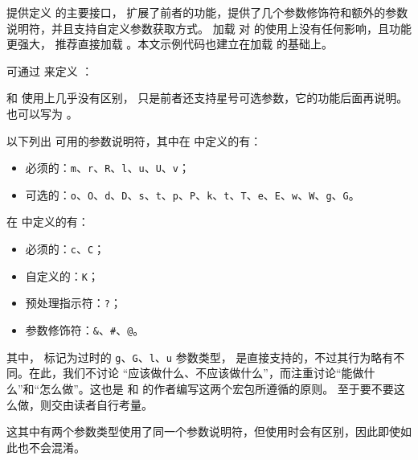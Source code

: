 \documentclass[openany]{book}
\begin{document}
 提供定义  的主要接口，
扩展了前者的功能，提供了几个参数修饰符和额外的参数说明符，并且支持自定义参数获取方式。
加载  对  的使用上没有任何影响，且功能更强大，
推荐直接加载 。本文示例代码也建立在加载  的基础上。

可通过  来定义 ：
\begin{syntax}
  \V\DeclareEKeysCommand   {}  
  \V\DeclareEKeysCommand *   
\end{syntax}
 和  使用上几乎没有区别，
只是前者还支持星号可选参数，它的功能后面再说明。
 也可以写为 。

以下列出  可用的参数说明符，其中在  中定义的有：
\begin{itemize}
  \item 必须的：\texttt m、\texttt r、\texttt R、\texttt l、\texttt u、\texttt U、\texttt v；
  \item 可选的：\texttt o、\texttt O、\texttt d、\texttt D、\texttt s、\texttt t、\texttt p、\texttt P、\texttt k、\texttt t、\texttt T、\texttt e、\texttt E、\texttt w、\texttt W、\texttt g、\texttt G。
\end{itemize}
在  中定义的有：
\begin{itemize}
  \item 必须的：\texttt c、\texttt C；
  \item 自定义的：\texttt K；
  \item 预处理指示符：\texttt ?；
  \item 参数修饰符：\texttt\&、\texttt\#、\texttt @。
\end{itemize}

其中， 标记为过时的 \texttt g、\texttt G、\texttt l、\texttt u 
参数类型， 是直接支持的，不过其行为略有不同。在此，我们不讨论
“应该做什么、不应该做什么”，而注重讨论“能做什么”和“怎么做”。这也是 
 和  的作者编写这两个宏包所遵循的原则。
至于要不要这么做，则交由读者自行考量。

这其中有两个参数类型使用了同一个参数说明符，但使用时会有区别，因此即使如此也不会混淆。
\end{document}
